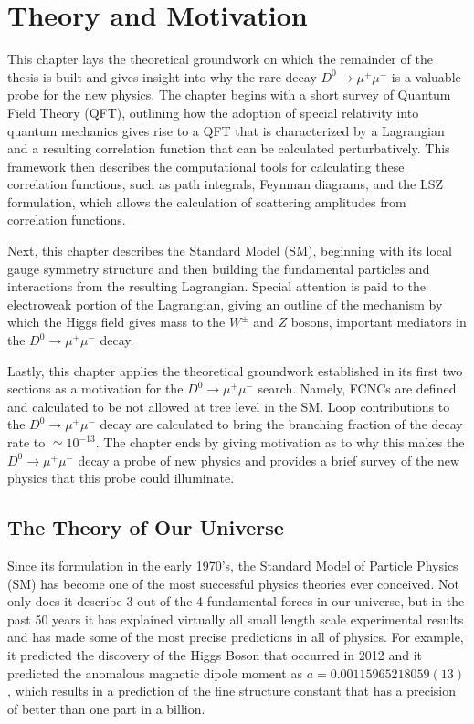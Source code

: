 \chapter{Theory and Motivation}
\label{ch:2}

This chapter lays the theoretical groundwork on which the remainder of the thesis is built and gives insight into why the rare decay $D^0 \to \mu^+ \mu^-$ is a valuable probe for the new physics. The chapter begins with a short survey of Quantum Field Theory (QFT), outlining how the adoption of special relativity into quantum mechanics gives rise to a QFT that is characterized by a Lagrangian and a resulting correlation function that can be calculated perturbatively. This framework then describes the computational tools for calculating these correlation functions, such as path integrals, Feynman diagrams, and the LSZ formulation, which allows the calculation of scattering amplitudes from correlation functions. 

Next, this chapter describes the Standard Model (SM), beginning with its local gauge symmetry structure and then building the fundamental particles and interactions from the resulting Lagrangian. Special attention is paid to the electroweak portion of the Lagrangian, giving an outline of the mechanism by which the Higgs field gives mass to the $W^\pm$ and $Z$ bosons, important mediators in the $D^0 \to \mu^+ \mu^-$ decay. 

Lastly, this chapter applies the theoretical groundwork established in its first two sections as a motivation for the $D^0 \to \mu^+ \mu^-$ search. Namely, FCNCs are defined and calculated to be not allowed at tree level in the SM. Loop contributions to the $D^0 \to \mu^+ \mu^-$ decay are calculated to bring the branching fraction of the decay rate to $\simeq 10^{-13}$. The chapter ends by giving motivation as to why this makes the $D^0 \to \mu^+ \mu^-$ decay a probe of new physics and provides a brief survey of the new physics that this probe could illuminate. 

\section{The Theory of Our Universe}

Since its formulation in the early 1970's, the Standard Model of Particle Physics (SM) has become one of the most successful physics theories ever conceived. Not only does it describe 3 out of the 4 fundamental forces in our universe, but in the past 50 years it has explained virtually all small length scale experimental results and has made some of the most precise predictions in all of physics. For example, it predicted the discovery of the Higgs Boson that occurred in 2012 \cite{ref:cms2012observation}\cite{ref:atlas2012observation} and it predicted the anomalous magnetic dipole moment as $a = 0.00115965218059(13)$ \cite{ref:fan_2023}, which results in a prediction of the fine structure constant that has a precision of better than one part in a billion.

